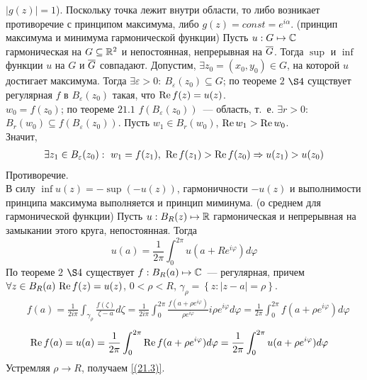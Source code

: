 $\left| g(z) \right| = 1$). Поскольку точка лежит внутри области, то либо
возникает противоречие с принципом максимума, либо $g(z) = const = e^{i
  \alpha}$.
\theorem (принцип максимума и минимума гармонической функции)
Пусть $u: G \mapsto \mathbb{C}$ гармоническая на $G \subseteq \mathbb{R}^2$ и непостоянная,
непрерывная на $\overline{G}$. Тогда $\sup$ и $\inf$ функции $u$ на $G$ и $\overline{G}$
совпадают.
\pr
Допустим, $\exists z_0 = (x_0, y_0)\in G$, на которой $u$ достигает максимума.
Тогда $\exists \varepsilon > 0: \ B_\varepsilon(z_0)\subseteq G$; по теореме $2$
$\S 4$ сущствует регулярная $f$ в $B_\varepsilon(z_0)$ такая, что $\mathrm{Re}\, f(z) =
u(z)$.
\\
$w_0 = f(z_0)$; по теореме $21.1$ $f(B_\varepsilon(z_0))$~--- область, т.~е.
$\exists r > 0$: $B_r(w_0) \subseteq f(B_{\varepsilon}(z_0))$. Пусть $w_1 \in
B_r(w_0)$, $\mathrm{Re}\, w_1 > \mathrm{Re}\, w_0$.
\\
Значит,
\begin{align*}
  \exists z_1 \in B_\varepsilon(z_0): \ w_1 = f(z_1), \ \mathrm{Re}\, f(z_1) > \mathrm{Re}\, f(z_0) \Rightarrow u(z_1)>u(z_0)
\end{align*}
Противоречие.
\\
В силу $\inf u(z) = - \sup(-u(z))$, гармоничности $-u(z)$ и выполнимости
принципа максимума выполняется и принцип миминума.
\theorem (о среднем для гармонической функции)
Пусть $u: B_R(z) \mapsto \mathbb{R}$ гармоническая и непрерывная на замыкании
этого круга, непостоянная. Тогда
\begin{equation}\label{(21.3)}
    u(a) = \frac{1}{2\pi}\int_0^{2\pi}u(a+Re^{i\varphi})d\varphi
\end{equation}
\pr
По теореме $2$ $\S 4$ существует $f: B_R(a) \mapsto \mathbb{C}$~--- регулярная, причем
$\forall z \in B_R(a) \ \mathrm{Re}\, f(z) = u(z)$, $0<\rho < R$, $\gamma_\rho =
\left\{ z: \left| z-a \right| = \rho\right\}$.
\begin{align*}
  & f(a) = \frac{1}{2 i \pi}\int_{\gamma_\rho}\frac{f(\zeta)}{\zeta - a}d\zeta = \frac{1}{2i\pi}\int_0^{2\pi}\frac{f(a+\rho e^{i\varphi})}{\rho e^{i\varphi}} i \rho e^{i\varphi} d \varphi = \frac{1}{2\pi}\int_0^{2\pi}f(a+\rho e^{i\varphi})d \varphi
\end{align*}
\begin{align*}
  & \mathrm{Re}\, f(a) = u(a) = \frac{1}{2\pi}\int_0^{2\pi}\mathrm{Re}\, f(a+\rho e^{i\varphi})d \varphi = \frac{1}{2\pi}\int_0^{2\pi}u (a+\rho e^{i\varphi})d \varphi
\end{align*}
Устремляя $\rho \to R$, получаем \eqref{(21.3)}.
